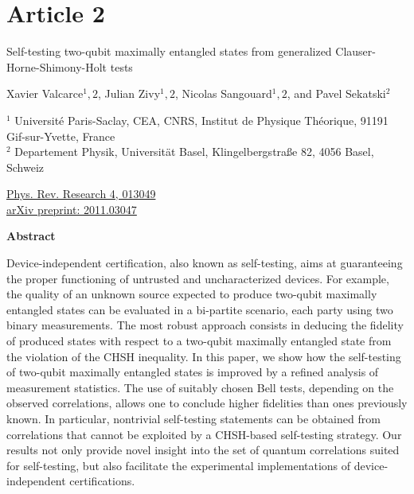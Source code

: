\chapter*{Article 2}

\begin{center}
\textrm{\LARGE Self-testing two-qubit maximally entangled states from generalized Clauser-Horne-Shimony-Holt tests}

\vspace{2cm}

\normalsize
Xavier Valcarce$^1,2$, Julian Zivy$^1,2$, Nicolas Sangouard$^1,2$, and Pavel Sekatski$^2$
\bigbreak

{\footnotesize
	$^1$ Université Paris-Saclay, CEA, CNRS, Institut de Physique Théorique, 91191 Gif-sur-Yvette, France \\
	$^2$ Departement Physik, Universität Basel, Klingelbergstraße 82, 4056 Basel, Schweiz
}

\raggedright
\bigbreak
\faLink \quad \href{https://journals.aps.org/prresearch/abstract/10.1103/PhysRevResearch.4.013049}{Phys. Rev. Research 4, 013049} \\
\faLink \quad \href{https://arxiv.org/abs/2011.03047}{arXiv preprint: 2011.03047}
\vspace{1cm}

\centering
\textbf{Abstract}
\bigbreak

Device-independent certification, also known as self-testing, aims at guaranteeing the proper functioning of untrusted and uncharacterized devices.
For example, the quality of an unknown source expected to produce two-qubit maximally entangled states can be evaluated in a bi-partite scenario, each party using two binary measurements.
The most robust approach consists in deducing the fidelity of produced states with respect to a two-qubit maximally entangled state from the violation of the CHSH inequality.
In this paper, we show how the self-testing of two-qubit maximally entangled states is improved by a refined analysis of measurement statistics.
The use of suitably chosen Bell tests, depending on the observed correlations, allows one to conclude higher fidelities than ones previously known.
In particular, nontrivial self-testing statements can be obtained from correlations that cannot be exploited by a CHSH-based self-testing strategy.
Our results not only provide novel insight into the set of quantum correlations suited for self-testing, but also facilitate the experimental implementations of device-independent certifications.
\end{center}
